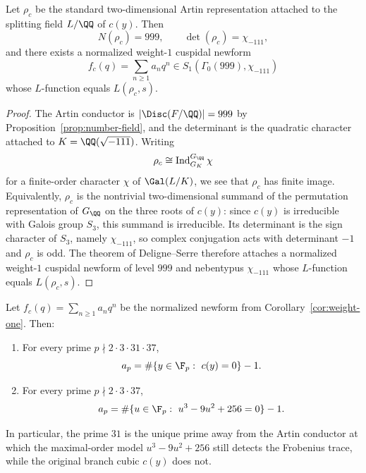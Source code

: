 \begin{corollary}\label{cor:weight-one}
Let \(\rho_c\) be the standard two-dimensional Artin representation attached to the splitting field \(L/\QQ\) of \(c(y)\). Then
\[
N(\rho_c)=999,
\qquad
\det(\rho_c)=\chi_{-111},
\]
and there exists a normalized weight-\(1\) cuspidal newform
\[
f_c(q)=\sum_{n\geq 1} a_n q^n\in S_1(\Gamma_0(999),\chi_{-111})
\]
whose \(L\)-function equals \(L(\rho_c,s)\).
\end{corollary}

\begin{proof}
The Artin conductor is \(|\Disc(F/\QQ)|=999\) by Proposition~\ref{prop:number-field}, and the determinant is the quadratic character attached to \(K=\QQ(\sqrt{-111})\). Writing
\[
\rho_c\cong \operatorname{Ind}_{G_K}^{G_\QQ}\chi
\]
for a finite-order character \(\chi\) of \(\Gal(L/K)\), we see that \(\rho_c\) has finite image. Equivalently, \(\rho_c\) is the nontrivial two-dimensional summand of the permutation representation of \(G_\QQ\) on the three roots of \(c(y)\): since \(c(y)\) is irreducible with Galois group \(S_3\), this summand is irreducible. Its determinant is the sign character of \(S_3\), namely \(\chi_{-111}\), so complex conjugation acts with determinant \(-1\) and \(\rho_c\) is odd. The theorem of Deligne--Serre \cite{DeligneSerre1974WeightOne} therefore attaches a normalized weight-\(1\) cuspidal newform of level \(999\) and nebentypus \(\chi_{-111}\) whose \(L\)-function equals \(L(\rho_c,s)\).
\end{proof}

\begin{theorem}\label{thm:hecke-traces}
Let \(f_c(q)=\sum_{n\geq 1} a_n q^n\) be the normalized newform from Corollary~\ref{cor:weight-one}. Then:
\begin{enumerate}
\item[(i)] For every prime \(p\nmid 2\cdot 3\cdot 31\cdot 37\),
\[
a_p=\#\{y\in \F_p:\ c(y)=0\}-1.
\]
\item[(ii)] For every prime \(p\nmid 2\cdot 3\cdot 37\),
\[
a_p=\#\{u\in \F_p:\ u^3-9u^2+256=0\}-1.
\]
\end{enumerate}
In particular, the prime \(31\) is the unique prime away from the Artin conductor at which the maximal-order model \(u^3-9u^2+256\) still detects the Frobenius trace, while the original branch cubic \(c(y)\) does not.
\end{theorem}


